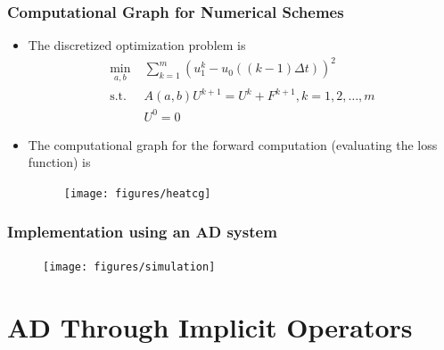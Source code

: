 \documentclass{beamer}
\begin{document}
\begin{frame}
	\frametitle{Computational Graph for Numerical Schemes}
	
	\begin{itemize}
		\item The discretized optimization problem is 
		\begin{align*}
			\min_{a, b}& \; \sum_{k=1}^m (u^k_1 - u_0( (k-1)\Delta t))^2\\
			\text{s.t.} & \; A(a,b)U^{k+1} = U^k + F^{k+1}, k = 1, 2,\ldots, m \\
			& \; U^0 = 0
		\end{align*}
		\item The computational graph for the forward computation (evaluating the loss function) is 
		\begin{figure}[hbt]
		\centering
  \texttt{[image: figures/heatcg]}
\end{figure}

	\end{itemize}
\end{frame}

\begin{frame}
	\frametitle{Implementation using an AD system}
	
	\begin{figure}[hbt]
  \texttt{[image: figures/simulation]}
\end{figure}

\end{frame}


\section{AD Through Implicit Operators}
\end{document}
